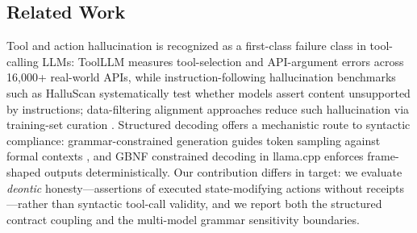 \documentclass[11pt,a4paper]{article}
\begin{document}
\subsection{Related Work}
\label{sec:related}
Tool and action hallucination is recognized as a first-class failure class in tool-calling LLMs: ToolLLM \cite{toolllm2023} measures tool-selection and API-argument errors across 16{,}000+ real-world APIs, while instruction-following hallucination benchmarks such as HalluScan \cite{halluscscan2026} systematically test whether models assert content unsupported by instructions; data-filtering alignment approaches reduce such hallucination via training-set curation \cite{sietal2025}. Structured decoding offers a mechanistic route to syntactic compliance: grammar-constrained generation guides token sampling against formal contexts \cite{willardlouf2023}, and GBNF constrained decoding in llama.cpp enforces frame-shaped outputs deterministically. Our contribution differs in target: we evaluate \emph{deontic} honesty---assertions of executed state-modifying actions without receipts---rather than syntactic tool-call validity, and we report both the structured contract coupling and the multi-model grammar sensitivity boundaries.
\end{document}
